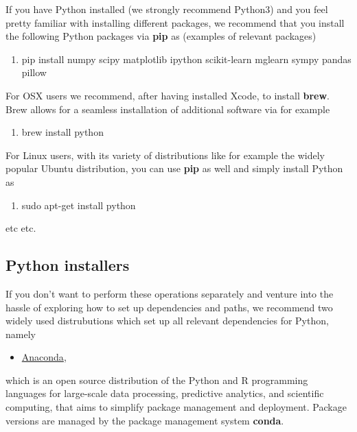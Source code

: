 \documentclass[%
oneside,                 %
final,                   %
10pt]{article}
\begin{document}
If you have Python installed (we strongly recommend Python3) and you feel
pretty familiar with installing different packages, we recommend that
you install the following Python packages via \textbf{pip} as (examples of relevant packages)

\begin{enumerate}
\item pip install numpy scipy matplotlib ipython scikit-learn mglearn sympy pandas pillow 
\end{enumerate}

\noindent
For OSX users we recommend, after having installed Xcode, to
install \textbf{brew}. Brew allows for a seamless installation of additional
software via for example 

\begin{enumerate}
\item brew install python
\end{enumerate}

\noindent
For Linux users, with its variety of distributions like for example the widely popular Ubuntu distribution,
you can use \textbf{pip} as well and simply install Python as 

\begin{enumerate}
\item sudo apt-get install python
\end{enumerate}

\noindent
etc etc. 


\subsection{Python installers}

If you don't want to perform these operations separately and venture
into the hassle of exploring how to set up dependencies and paths, we
recommend two widely used distrubutions which set up all relevant
dependencies for Python, namely 

\begin{itemize}
\item \href{{https://docs.anaconda.com/}}{Anaconda}, 
\end{itemize}

\noindent
which is an open source
distribution of the Python and R programming languages for large-scale
data processing, predictive analytics, and scientific computing, that
aims to simplify package management and deployment. Package versions
are managed by the package management system \textbf{conda}. 
\end{document}
